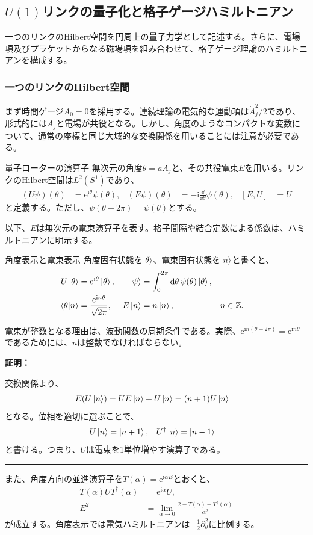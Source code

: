 \documentclass[a4paper,10.5pt]{article}
\numberwithin{equation}{section}
\providecommand{\ii}{\mathrm{i}}
\providecommand{\ee}{\mathrm{e}}
\newenvironment{proofbox}
{\begin{prooflabel}\textbf{証明：}\end{prooflabel}\vspace{0.8em}}
{\par\vspace{1em}\hrule\vspace{1em}}
\begin{document}
\subsection{$U(1)$リンクの量子化と格子ゲージハミルトニアン}
一つのリンクのHilbert空間を円周上の量子力学として記述する。さらに、電場項及びプラケットからなる磁場項を組み合わせて、格子ゲージ理論のハミルトニアンを構成する。

\subsubsection{一つのリンクのHilbert空間}
まず時間ゲージ$A_0=0$を採用する。連続理論の電気的な運動項は$\dot A_j^2/2$であり、形式的には$A_j$と電場が共役となる。しかし、角度のようなコンパクトな変数について、通常の座標と同じ大域的な交換関係を用いることには注意が必要である。
\begin{defbox}{量子ローターの演算子}
無次元の角度$\theta=aA_j$と、その共役電束$E$を用いる。リンクのHilbert空間は$L^2(S^1)$であり、
\begin{align}
(U\psi)(\theta)&=\ee^{\ii\theta}\psi(\theta),&
(E\psi)(\theta)&=-\ii\frac{\dd}{\dd\theta}\psi(\theta),&
[E,U]&=U
\label{eq:rotor}
\end{align}
と定義する。ただし、$\psi(\theta+2\pi)=\psi(\theta)$とする。
\end{defbox}
以下、$E$は無次元の電束演算子を表す。格子間隔や結合定数による係数は、ハミルトニアンに明示する。
\begin{resultbox}{角度表示と電束表示}
角度固有状態を$\ket{\theta}$、電束固有状態を$\ket n$と書くと、
\begin{align}
U\ket\theta&=\ee^{\ii\theta}\ket\theta,&
\ket\psi&=\int_0^{2\pi}\dd\theta\,\psi(\theta)\ket\theta,\\
\braket{\theta}{n}&=\frac{\ee^{\ii n\theta}}{\sqrt{2\pi}},&
E\ket n&=n\ket n,&n&\in\mathbb Z.
\end{align}
\end{resultbox}
電束が整数となる理由は、波動関数の周期条件である。実際、$\ee^{\ii n(\theta+2\pi)}=\ee^{\ii n\theta}$であるためには、$n$は整数でなければならない。
\begin{proofbox}
交換関係より、
\begin{align}
E(U\ket n)&=UE\ket n+U\ket n=(n+1)U\ket n
\end{align}
となる。位相を適切に選ぶことで、
\begin{align}
U\ket n&=\ket{n+1},&U^\dagger\ket n&=\ket{n-1}
\end{align}
と書ける。つまり、$U$は電束を1単位増やす演算子である。
\end{proofbox}
また、角度方向の並進演算子を$T(\alpha)=\ee^{\ii\alpha E}$とおくと、
\begin{align}
T(\alpha)UT^\dagger(\alpha)&=\ee^{\ii\alpha}U,\\
E^2&=\lim_{\alpha\to0}
\frac{2-T(\alpha)-T^\dagger(\alpha)}{\alpha^2}
\end{align}
が成立する。角度表示では電気ハミルトニアンは$-\frac12\partial_\theta^2$に比例する。
\end{document}
